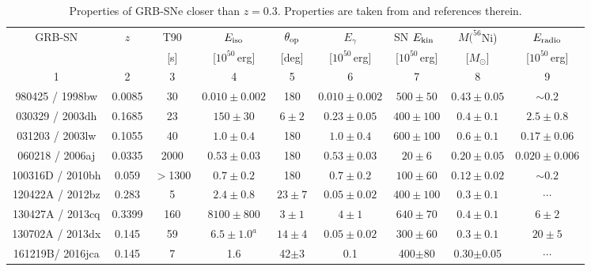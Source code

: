 \documentclass[fleqn,usenatbib]{mnras}
\newcommand{\KE}{$E_{\rm kin}$}
\begin{document}
\begin{table}

  \caption{Properties of GRB-SNe closer than $z =0.3$. Properties are taken from \citep{Mazzali14} and references therein.}
  \begin{tabular}{ccccccccc}
  \hline
  GRB-SN   	 &  $z$   &  T90   &   $E_{\rm iso}$  & $\theta_{\rm op}$ &  $E_{\gamma}$  &   SN \KE\      &    $M(^{56}$Ni)&    $E_{\rm radio}$     \\ 
                 &        &   [s]  &  [$10^{50}$\,erg] &   [deg]   &   [$10^{50}$\,erg] & [$10^{50}$\,erg]&   [$M_\odot$]  &  [$10^{50}$\,erg]   \\
        1        &    2   &    3   &        4         &     5     &         6         &        7       &       8        &         9          \\
 \hline
980425  / 1998bw & 0.0085 &   30 & $0.010 \pm 0.002$ & 180        & $0.010 \pm 0.002$ & $500 \pm  50$ & $0.43 \pm 0.05$ & $\sim 0.2$          \\
030329  / 2003dh & 0.1685 &   23 & $  150 \pm 30$    & $6 \pm 2$  & $0.23 \pm  0.05$  & $400 \pm 100$ & $0.4 \pm 0.1$   & $2.5 \pm 0.8$      \\
031203  / 2003lw & 0.1055 &   40 & $  1.0 \pm 0.4$   & 180        & $1.0 \pm 0.4$     & $600 \pm 100$ & $0.6 \pm 0.1$   & $0.17 \pm 0.06$   \\
060218  / 2006aj & 0.0335 & 2000 & $ 0.53 \pm 0.03$  & 180        & $0.53 \pm 0.03$   & $20 \pm 6$ & $0.20 \pm 0.05$ & $0.020 \pm 0.006$\\
100316D / 2010bh & 0.059  & $>$1300 & $ 0.7 \pm 0.2$ & 180        & $0.7 \pm  0.2$    & $100 \pm  60$ & $0.12 \pm 0.02$ & $\sim 0.2$         \\ 
120422A / 2012bz & 0.283  &    5 & $ 2.4  \pm 0.8$   & $23 \pm 7$ & $0.05  \pm 0.02$  & $400 \pm 100$ & $0.3 \pm  0.1$  &  $\cdots$ \\
130427A / 2013cq & 0.3399 &  160 & $8100  \pm 800$   & $3 \pm 1$  & $4 \pm 1$     & $640 \pm  70$   & $0.4 \pm 0.1$ & $6 \pm 2$           \\
130702A / 2013dx & 0.145  &   59 & $ 6.5 \pm  1.0^a$ & $14 \pm 4$ & $0.05 \pm 0.02$   & $300 \pm  60$ & $0.3 \pm 0.1$   & $20 \pm 5$       \\
161219B/ 2016jca & 0.145  &7&  1.6   &   42$\pm$3      & 0.1 &   400$\pm$80       &    0.30$\pm$0.05                   &    $\cdots$             \\
\hline
\end{tabular}
\label{table:GRBSNprop}
\end{table}
\end{document}
